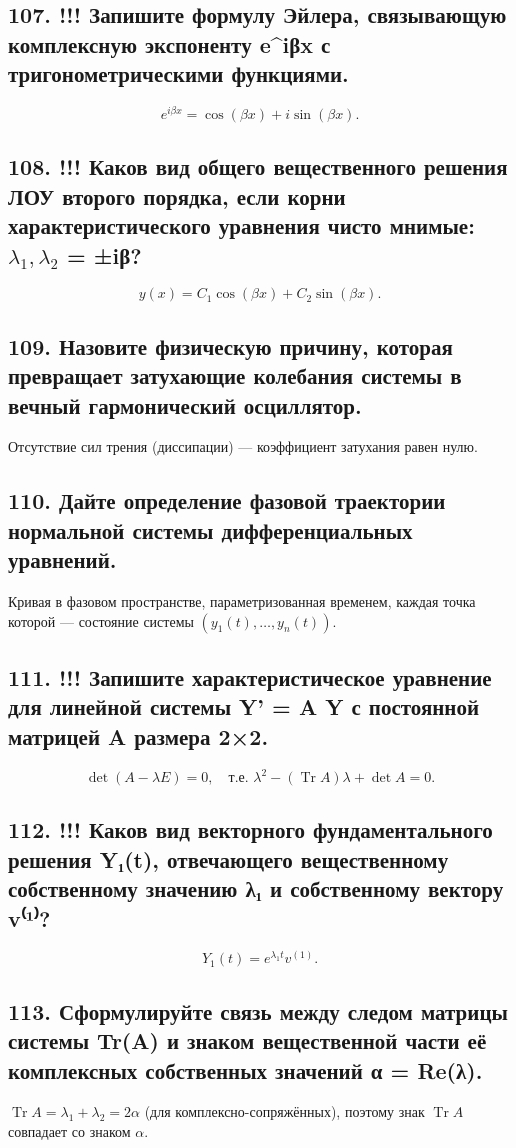 \documentclass[a4paper,12pt]{article}
\newcommand{\tr}{\operatorname{Tr}}
\begin{document}
\subsection*{107. !!! Запишите формулу Эйлера, связывающую комплексную экспоненту e^{iβx} с тригонометрическими функциями.}
\[ e^{i\beta x} = \cos(\beta x) + i \sin(\beta x). \]

\subsection*{108. !!! Каков вид общего вещественного решения ЛОУ второго порядка, если корни характеристического уравнения чисто мнимые: $\lambda_1,\lambda_2$ = ±iβ?}
\[ y(x) = C_1 \cos(\beta x) + C_2 \sin(\beta x). \]

\subsection*{109. Назовите физическую причину, которая превращает затухающие колебания системы в вечный гармонический осциллятор.}
Отсутствие сил трения (диссипации) — коэффициент затухания равен нулю.

\subsection*{110. Дайте определение фазовой траектории нормальной системы дифференциальных уравнений.}
Кривая в фазовом пространстве, параметризованная временем, каждая точка которой — состояние системы \((y_1(t), \dots, y_n(t))\).

\subsection*{111. !!! Запишите характеристическое уравнение для линейной системы Y' = A Y с постоянной матрицей A размера 2×2.}
\[ \det(A - \lambda E) = 0, \quad \text{т.е. } \lambda^2 - (\tr A)\lambda + \det A = 0. \]

\subsection*{112. !!! Каков вид векторного фундаментального решения Y₁(t), отвечающего вещественному собственному значению λ₁ и собственному вектору v⁽¹⁾?}
\[ Y_1(t) = e^{\lambda_1 t} v^{(1)}. \]

\subsection*{113. Сформулируйте связь между следом матрицы системы Tr(A) и знаком вещественной части её комплексных собственных значений α = Re(λ).}
\(\tr A = \lambda_1 + \lambda_2 = 2\alpha\) (для комплексно-сопряжённых), поэтому знак \(\tr A\) совпадает со знаком \(\alpha\).
\end{document}
